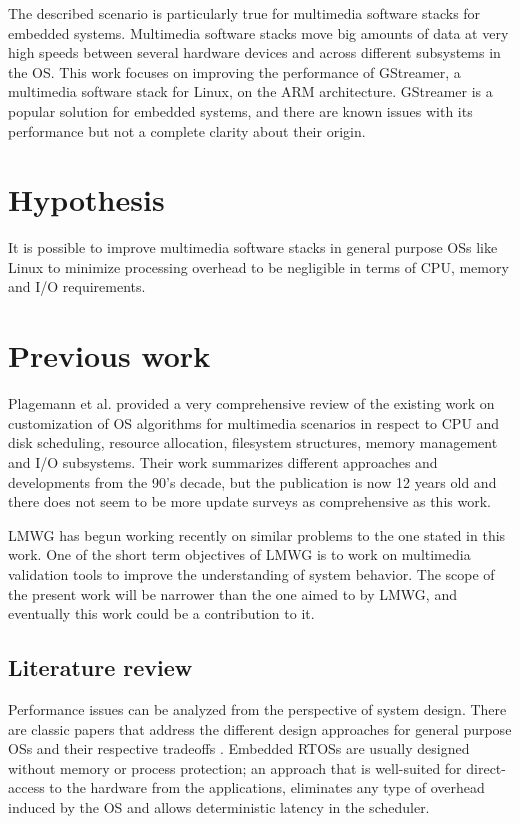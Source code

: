 The described scenario is particularly true for multimedia software stacks for embedded systems. Multimedia software stacks move big amounts of data at very high speeds between several hardware devices and across different subsystems in the \ac{OS}. This work focuses on improving the performance of GStreamer, a multimedia software stack for Linux, on the \ac{ARM} architecture. GStreamer is a popular solution for embedded systems, and there are known issues with its performance but not a complete clarity about their origin\cite{Contreras:vn}.

\section{Hypothesis}
It is possible to improve multimedia software stacks in general purpose \aclp{OS} like Linux to minimize processing overhead to be negligible in terms of CPU, memory and I/O requirements.

\section{Previous work}
Plagemann et al.\cite{Plagemann2000267} provided a very comprehensive review of the existing work on  customization of \ac{OS} algorithms for multimedia scenarios in respect to CPU and disk scheduling, resource allocation, filesystem structures, memory management and I/O subsystems. Their work summarizes different approaches and developments from the 90's decade, but the publication is now 12 years old and there does not seem to be more update surveys as comprehensive as this work.

\ac{LMWG} has begun working recently on similar problems\cite{Reis:vn} to the one stated in this work. One of the short term objectives of \ac{LMWG} is to work on multimedia validation tools to improve the understanding of system behavior. The scope of the present work will be narrower than the one aimed to by \ac{LMWG}, and eventually this work could be a contribution to it.

\subsection{Literature review}
Performance issues can be analyzed from the perspective of system design. There are classic papers that address the different design approaches for general purpose \aclp{OS} and their respective tradeoffs \cite{Engler95exokernel:an}\cite{Bershad95extensibility}\citep{Liedtke:1995kx}. Embedded \acp{RTOS} are usually designed without memory or process protection; an approach that is well-suited for direct-access to the hardware from the applications, eliminates any type of overhead induced by the \ac{OS} and allows deterministic latency in the scheduler.

